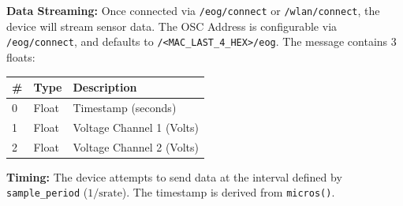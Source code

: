 {\bf Data Streaming:} Once connected via \texttt{/eog/connect}
or \texttt{/wlan/connect}, the device will stream sensor data.  The
OSC Address is configurable via \texttt{/eog/connect}, and defaults
to \texttt{/<MAC\_LAST\_4\_HEX>/eog}. The message contains 3 floats:

{\small
\begin{tabular}{|l|l|l|}
\hline
\textbf{\#} & \textbf{Type} & \textbf{Description} \\ \hline
0 & Float & Timestamp (seconds) \\ \hline
1 & Float & Voltage Channel 1 (Volts) \\ \hline
2 & Float & Voltage Channel 2 (Volts) \\ \hline
\end{tabular}
}

{\bf Timing:}
The device attempts to send data at the interval defined by \texttt{sample\_period} ($1 / \text{srate}$). The timestamp is derived from \texttt{micros()}.

